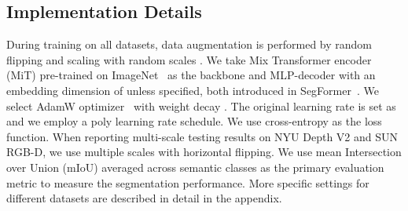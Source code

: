 \documentclass[journal]{IEEEtran}
\begin{document}
\subsection{Implementation Details}
During training on all datasets, data augmentation is performed by random flipping and scaling with random scales .
We take Mix Transformer encoder (MiT) pre-trained on ImageNet~\cite{russakovsky2015imagenet} as the backbone and MLP-decoder with an embedding dimension of  unless specified, both introduced in SegFormer~\cite{xie2021segformer}. We select AdamW optimizer~\cite{kingma2014adam} with weight decay .
The original learning rate is set as  and we employ a poly learning rate schedule.
We use cross-entropy as the loss function.
When reporting multi-scale testing results on NYU Depth V2 and SUN RGB-D, we use multiple scales  with horizontal flipping.
We use mean Intersection over Union (mIoU) averaged across semantic classes as the primary evaluation metric to measure the segmentation performance.
More specific settings for different datasets are described in detail in the appendix.
\end{document}
